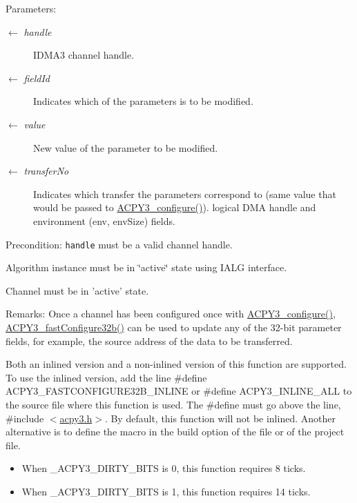 \begin{Desc}
\item[Parameters:]
\begin{description}
\item[\mbox{$\leftarrow$} {\em handle}]IDMA3 channel handle. \item[\mbox{$\leftarrow$} {\em field\-Id}]Indicates which of the parameters is to be modified. \item[\mbox{$\leftarrow$} {\em value}]New value of the parameter to be modified. \item[\mbox{$\leftarrow$} {\em transfer\-No}]Indicates which transfer the parameters correspond to (same value that would be passed to \hyperlink{group___d_s_p_a_c_p_y3_g427e8e4fd5c445b2f9bb5d971c06c099}{ACPY3\_\-configure()}). logical DMA handle and environment (env, env\-Size) fields.\end{description}
\end{Desc}
\begin{Desc}
\item[Precondition:]{\tt handle} must be a valid channel handle.

Algorithm instance must be in \char`\"{}active\char`\"{} state using IALG interface.

Channel must be in 'active' state.\end{Desc}
\begin{Desc}
\item[Remarks:]Once a channel has been configured once with \hyperlink{group___d_s_p_a_c_p_y3_g427e8e4fd5c445b2f9bb5d971c06c099}{ACPY3\_\-configure()}, \hyperlink{group___d_s_p_a_c_p_y3_g2ad7ed5dc554a991c4c11f644f5a8272}{ACPY3\_\-fast\-Configure32b()} can be used to update any of the 32-bit parameter fields, for example, the source address of the data to be transferred.

Both an inlined version and a non-inlined version of this function are supported. To use the inlined version, add the line \#define ACPY3\_\-FASTCONFIGURE32B\_\-INLINE or \#define ACPY3\_\-INLINE\_\-ALL to the source file where this function is used. The \#define must go above the line, \#include $<$\hyperlink{acpy3_8h}{acpy3.h}$>$. By default, this function will not be inlined. Another alternative is to define the macro in the build option of the file or of the project file.

\begin{itemize}
\item When \_\-ACPY3\_\-DIRTY\_\-BITS is 0, this function requires 8 ticks.\item When \_\-ACPY3\_\-DIRTY\_\-BITS is 1, this function requires 14 ticks. \end{itemize}
\end{Desc}
